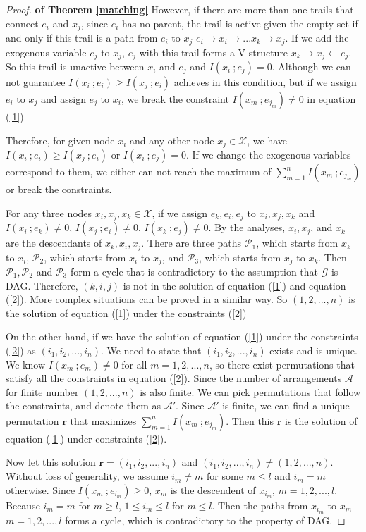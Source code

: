 \documentclass[twoside,11pt]{article}
\begin{document}
\begin{proof}{\textbf{of Theorem \ref{matching}}}
However, if there are more than one trails that connect $e_i$ and $x_j$, since $e_i$ has no parent, the trail is active given the empty set if and only if this trail is a path from $e_i$ to $x_j$ $e_i\to x_i\to ... x_k\to x_j$. If we add the exogenous variable $e_j$ to $x_j$, $e_j$ with this trail forms a V-structure $x_k\to x_j\gets e_j$. So this trail is unactive between $x_i$ and $e_j$ and $I(x_i\ ;e_j)=0$. Although we can not guarantee $I(x_i\ ;e_i)\geq I(x_j\ ;e_i)$ achieves in this condition, but if we assign $e_i$ to $x_j$ and assign $e_j$ to $x_i$, we break the constraint $I(x_m\ ;e_{j_m})\neq 0$ in equation (\ref{1})

Therefore, for given node $x_i$ and any other node $x_j\in\mathcal X$, we have $I(x_i\ ;e_i)\geq I(x_j\ ;e_i)$ or $I(x_i\ ;e_j)=0$. If we change the exogenous variables correspond to them, we either can not reach the maximum of $\sum^n_{m=1}I(x_m\ ;e_{j_m})$ or break the constraints.

For any three nodes $x_i, x_j, x_k\in\mathcal X$, if we assign $e_k, e_i, e_j$ to $x_i, x_j, x_k$ and $I(x_i\ ;e_k)\neq 0$, $I(x_j\ ;e_i)\neq 0$, $I(x_k\ ;e_j)\neq 0$. By the analyses, $x_i, x_j$, and $x_k$ are the descendants of $x_k, x_i, x_j$. There are three paths $\mathcal P_1$, which starts from $x_k$ to $x_i$, $\mathcal P_2$, which starts from $x_i$ to $x_j$, and $\mathcal P_3$, which starts from $x_j$ to $x_k$. Then $\mathcal P_1, \mathcal P_2$ and $\mathcal P_3$ form a cycle that is contradictory to the assumption that $\mathcal G$ is DAG. Therefore, $(k,i,j)$ is not in the solution of equation (\ref{1}) and equation (\ref{2}). More complex situations can be proved in a similar way. So $(1,2,...,n)$ is the solution of equation (\ref{1}) under the constraints (\ref{2})

On the other hand, if we have the solution of equation (\ref{1}) under the constraints (\ref{2}) as $(i_1, i_2,..., i_n)$. We need to state that $(i_1, i_2, ..., i_n)$ exists and is unique. We know $I(x_m\ ;e_m)\neq 0$ for all $m=1,2,...,n$, so there exist permutations that satisfy all the constraints in equation (\ref{2}). Since the number of arrangements $\mathcal A$ for finite number $(1,2,...,n)$ is also finite. We can pick permutations that follow the constraints, and denote them as $\mathcal A'$. Since $\mathcal A'$ is finite, we can find a unique permutation $\mathbf r$ that maximizes $\sum^n_{m=1}I(x_m\ ;e_{j_m})$. Then this $\mathbf r$ is the solution of equation (\ref{1}) under constraints (\ref{2}).

Now let this solution $\mathbf r=(i_1, i_2,..., i_n)$ and $(i_1, i_2,..., i_n)\neq (1,2,...,n)$. Without loss of generality, we assume $i_m\neq m$ for some $m\leq l$ and $i_m=m$ otherwise. Since $I(x_m\ ;e_{i_m})\geq 0$, $x_m$ is the descendent of $x_{i_m}$, $m=1,2,...,l$. Because $i_m=m$ for $m\geq l$, $1\leq i_m\leq l$ for $m\leq l$. Then the paths from $x_{i_m}$ to $x_m$ $m=1,2,...,l$ forms a cycle, which is contradictory to the property of DAG.


\end{proof}
\end{document}
